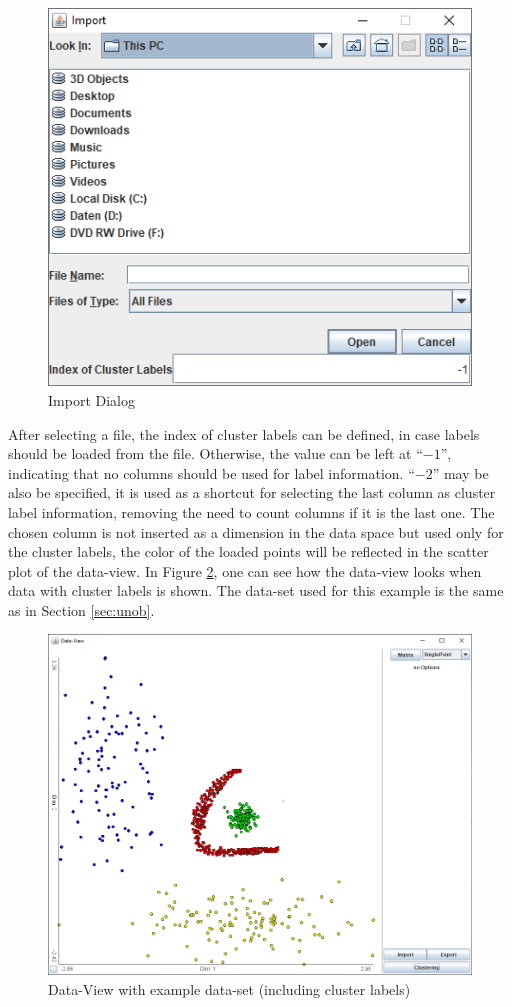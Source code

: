 \documentclass[
	a4paper,
	english,
	twoside,
	openright,               
	11pt                            
	]{report}
\begin{document}
\begin{figure}[H]
	\centering 
	\includegraphics[scale=.5]{data-import}%
	\caption{Import Dialog}
	\label{fig:data-import}
\end{figure}

After selecting a file, the index of cluster labels can be defined, in case labels should be loaded from the file. Otherwise, the value can be left at ``$-1$'', indicating that no columns should be used for label information. ``$-2$'' may be also be specified, it is used as a shortcut for selecting the last column as cluster label information, removing the need to count columns if it is the last one. The chosen column is not inserted as a dimension in the data space but used only for the cluster labels, the color of the loaded points will be reflected in the scatter plot of the data-view. In Figure \ref{fig:loaded-data}, one can see how the data-view looks when data with cluster labels is shown. The data-set used for this example is the same as in Section \ref{sec:unob}.

\begin{figure}[H]
	\centering
	\includegraphics[scale=.5]{unob}
	\caption{Data-View with example data-set (including cluster labels)}
	\label{fig:loaded-data}
\end{figure}
\end{document}
